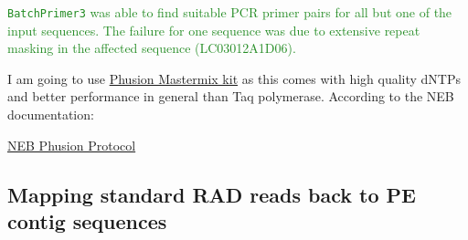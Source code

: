 \documentclass{article}\usepackage[]{graphicx}\usepackage[]{color}
\newcommand{\roger}[1]{ \textcolor[named]{ForestGreen}{#1} }
\begin{document}
\roger{ \texttt{BatchPrimer3} was able to find suitable PCR primer pairs for all but one of the input sequences. The failure for one sequence was due to extensive repeat masking in the affected sequence (LC03012A1D06). }

I am going to use \href{https://www.neb.com/protocols/2012/09/06/protocol-phusion-high-fidelity-pcr-master-mix-with-hf-buffer-m0531}{Phusion Mastermix kit} as this comes with high quality dNTPs and better performance in general than Taq polymerase. According to the NEB documentation:

\begin{epigraphs}
{ \href{https://www.neb.com/protocols/2012/09/06/protocol-phusion-high-fidelity-pcr-master-mix-with-hf-buffer-m0531}{NEB Phusion Protocol} }
\end{epigraphs}

\subsection{Mapping standard RAD reads back to PE contig sequences}

\end{document}
